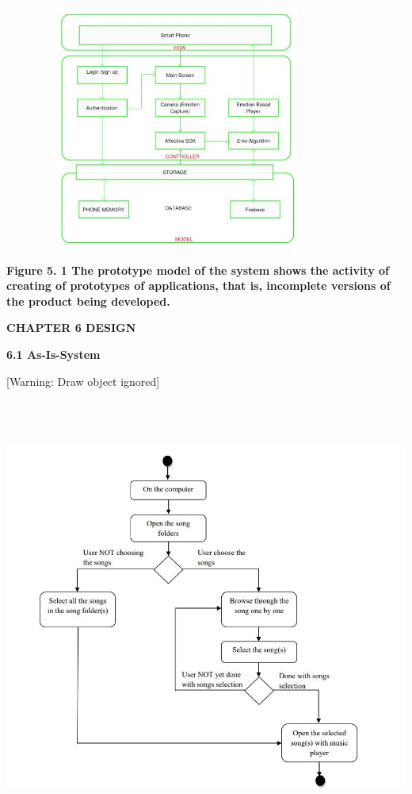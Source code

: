 \documentclass[a4paper]{article}
\begin{document}
{\centering  \includegraphics[width=4.448in,height=3.1665in]{rahulop-img004.jpg} \par}
\hypertarget{1y810tw}{}\textbf{Figure 5. 1 The prototype model of the system shows the activity of creating of
prototypes of applications, that is, incomplete versions of the product being developed. }


\bigskip


\bigskip

\clearpage\setcounter{page}{1}\pagestyle{Convertedxi}
{\bfseries
\hypertarget{4i7ojhp}{}CHAPTER 6 DESIGN}

{\bfseries
\hypertarget{2xcytpi}{}6.1 As-Is-System}

[Warning: Draw object ignored]

\begin{center}
\includegraphics[width=5.7917in,height=5.6563in]{rahulop-img008.jpg}
\end{center}
\end{document}
